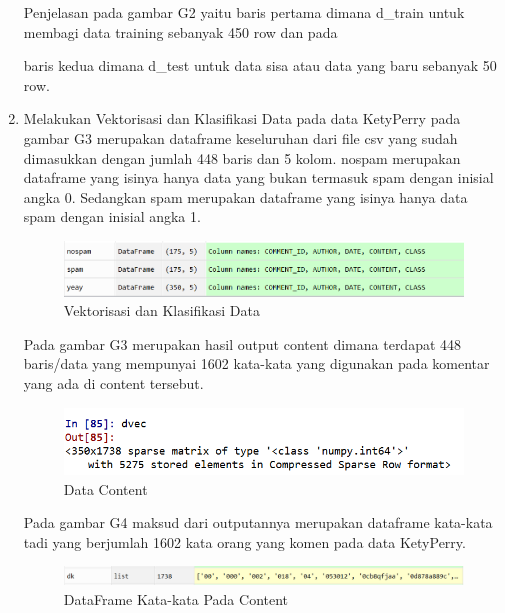 \begin{enumerate}
\subitem Penjelasan pada gambar G2 yaitu baris pertama dimana d\_train untuk membagi data training sebanyak 450 row dan pada 
\par baris kedua dimana d\_test untuk data sisa atau data yang baru sebanyak 50 row.
\item Melakukan Vektorisasi dan Klasifikasi Data pada data KetyPerry pada gambar G3  merupakan dataframe keseluruhan dari file csv yang sudah dimasukkan dengan jumlah 448 baris dan 5 kolom. nospam merupakan dataframe yang isinya hanya data yang bukan termasuk spam dengan inisial angka 0. Sedangkan spam merupakan dataframe yang isinya hanya data spam dengan inisial angka 1.
\begin{figure}[ht]
	\centerline{\includegraphics[width=1\textwidth]{figures/andi/G3.PNG}}
	\caption{Vektorisasi dan Klasifikasi Data}
	\label{Contoh Ilustrasi}
\end{figure}

\subitem  Pada gambar G3 merupakan hasil output content dimana terdapat 448 baris/data yang mempunyai 1602 kata-kata yang digunakan pada komentar yang ada di content tersebut.
\begin{figure}[ht]
	\centerline{\includegraphics[width=1\textwidth]{figures/andi/G4.PNG}}
	\caption{Data Content}
	\label{Contoh Ilustrasi}
\end{figure}

\subitem Pada gambar G4 maksud dari outputannya merupakan dataframe kata-kata tadi yang berjumlah 1602 kata orang 
 yang komen pada data KetyPerry.
\begin{figure}[ht]
	\centerline{\includegraphics[width=1\textwidth]{figures/andi/G5.PNG}}
	\caption{DataFrame Kata-kata Pada Content}
	\label{Contoh Ilustrasi}
\end{figure}


\end{enumerate}
